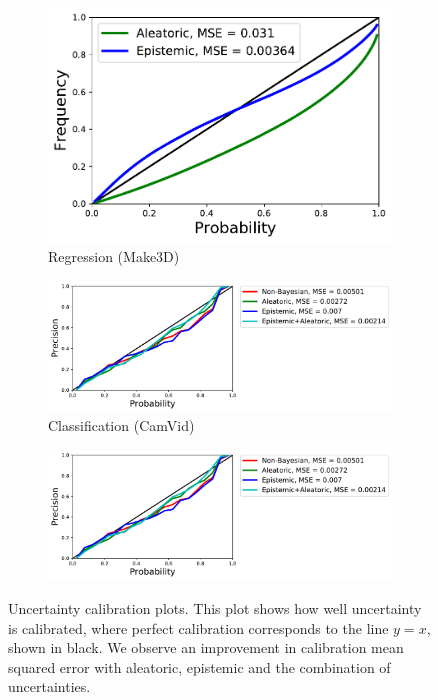 \begin{figure}[h]
\centering
    \begin{subfigure}[t]{0.33\linewidth}
        \centering
       \includegraphics[width=\linewidth]{calibration_plots_regression}
        \caption{Regression (Make3D)}
    \end{subfigure}
    \begin{subfigure}[t]{0.3\linewidth}
        \centering
       \includegraphics[width=\linewidth, trim=10mm 0mm 115mm 0mm, clip]{calibration_plots}
        \caption{Classification (CamVid)}
    \end{subfigure}
    \begin{subfigure}[t]{0.32\linewidth}
        \centering
       \includegraphics[width=\linewidth, trim=140mm 15mm 0mm 0mm, clip]{calibration_plots}
    \end{subfigure}
\caption[Uncertainty calibration plots.]{Uncertainty calibration plots. This plot shows how well uncertainty is calibrated, where perfect calibration corresponds to the line $y=x$, shown in black. We observe an improvement in calibration mean squared error with aleatoric, epistemic and the combination of uncertainties.}
\label{fig:calibrationplot}
\end{figure}


